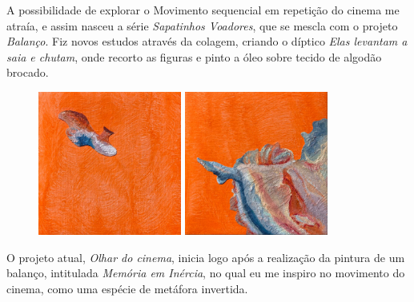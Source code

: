 \pagebreak

A possibilidade de explorar o Movimento sequencial em repetição do
cinema me atraía, e assim nasceu a série \emph{Sapatinhos Voadores},
que se mescla com o projeto \emph{Balanço}. Fiz novos estudos através
da colagem, criando o díptico \emph{Elas levantam a saia e chutam},
onde recorto as figuras e pinto a óleo sobre tecido de algodão brocado.

\begin{figure}
  \flushright
\begin{minipage}{3.9in}
	\caption{}
	\includegraphics[width=1.85432in,height=1.86598in]{figuras/odette-elas-levantam-saia-chutam-esquerda.pdf.compressed.pdf}
	\includegraphics[width=1.85903in,height=1.86339in]{figuras/odette-elas-levantam-saia-chutam-direita.pdf.compressed.pdf}
\end{minipage}
\end{figure}

O projeto atual, \emph{Olhar do cinema}, inicia logo após a realização
da pintura de um balanço, intitulada \emph{Memória em Inércia}, no qual
eu me inspiro no movimento do cinema, como uma espécie de metáfora
invertida.

